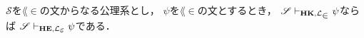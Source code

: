\begin{comment}
		$\varphi$を$\lang{\in}$の文とし，$\varphi_{1},\cdots,\varphi_{n}$を
		$\lang{\in}$の式からなる$\varphi$への{\bf HK}の証明とする．
		$\varphi_{i}$から$\varphi_{j}$にかけて汎化が用いられ(固有変項$a$)，
		$\varphi_{k}$から$\varphi_{\ell}$にかけて汎化が用いられているとき(固有変項$a$)，
		$\varphi_{1},\cdots,\varphi_{n}$に自由に現れる$a$を$b$に置き換えたものを
		$\hat{\varphi}_{1},\cdots,\hat{\varphi}_{n}$と書けば，
		\begin{align}
			\varphi_{1},\cdots,\varphi_{j},
			\hat{\varphi}_{1},\cdots,\hat{\varphi}_{j-1},\hat{\varphi}_{j+1},
			\cdots,\hat{\varphi}_{n}
		\end{align}
		は$\varphi$への正則証明になっている．
		\QED
	\end{comment}
	
	\begin{screen}
		\begin{metathm}
		\label{metathm:theorems_in_HK_provable_in_HE}
			$\mathscr{S}$を$\lang{\in}$の文からなる公理系とし，
			$\psi$を$\lang{\in}$の文とするとき，
			$\mathscr{S} \provable{\mbox{{\bf HK}},\lang{\in}} \psi$ならば
			$\mathscr{S} \provable{\mbox{{\bf HE}},\lang{\varepsilon}} \psi$である．
		\end{metathm}
	\end{screen}
	
